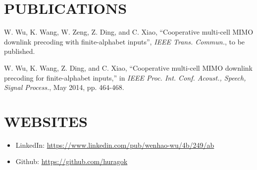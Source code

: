 \documentclass[margin]{res} %
\begin{document}
\begin{resume}
    
        \section{PUBLICATIONS}
        \begin{enumerate}[label={[\arabic*]}]
            \item W. Wu, K. Wang, W. Zeng, Z. Ding, and C. Xiao, ``Cooperative
            multi-cell MIMO downlink precoding with finite-alphabet inputs'',
            \emph{IEEE Trans. Commun.}, to be published.
            \item W. Wu, K. Wang, Z. Ding, and C. Xiao, ``Cooperative multi-cell
            MIMO downlink precoding for finite-alphabet inputs,'' in
            \emph{IEEE Proc. Int. Conf. Acoust., Speech, Signal Process.}, May
            2014, pp. 464-468.
        \end{enumerate}
    
    
        \section{WEBSITES} 
        \begin{itemize}
            \item LinkedIn: \url{https://www.linkedin.com/pub/wenhao-wu/4b/249/ab}
            \item Github: \url{https://github.com/huragok}
        \end{itemize}
        

\end{resume}
\end{document}
